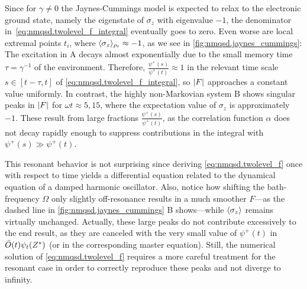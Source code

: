 Since for $\gamma \neq 0$ the Jaynes-Cummings model is expected to relax to the electronic ground state, namely the eigenstate of $\sigma_z$ with eigenvalue $-1$, the denominator in~\ref{eq:nmqsd.twolevel_f_integral} eventually goes to zero.
Even worse are local extremal points $t_i$, where $\langle \sigma_z \rangle_{\rho_t} \approx -1$, as we see in \autoref{fig:nmqsd.jaynes_cummings}:
The excitation in A decays almost exponentially due to the small memory time $\tau = \gamma^{-1}$ of the environment.
Therefore, $\frac{\psi^+(s)}{\psi^+(t)} \approx 1$ in the relevant time scale $s \in [t - \tau, t]$ of \autoref{eq:nmqsd.twolevel_f_integral}, so $\vert F \vert$ approaches a constant value uniformly.
In contrast, the highly non-Markovian system B shows singular peaks in $\vert F \vert$ for $\omega t \approx 5, 15$, where the expectation value of $\sigma_z$ is approximately $-1$.
These result from large fractions $\frac{\psi^+(s)}{\psi^+(t)}$, as the correlation function $\alpha$ does not decay rapidly enough to suppress contributions in the integral with $\psi^+(s) \gg \psi^+(t)$.


This resonant behavior is not surprising since deriving \autoref{eq:nmqsd.twolevel_f} once with respect to time yields a differential equation related to the dynamical equation of a damped harmonic oscillator.
Also, notice how shifting the bath-frequency $\Omega$ only slightly off-resonance results in a much smoother $F$---as the dashed line in \autoref{fig:nmqsd.jaynes_cummings} B shows---while $\langle \sigma_z \rangle$ remains virtually unchanged.
Actually, these large peaks do not contribute excessively to the end result, as they are canceled with the very small value of $\psi^+(t)$ in $\bar O(t) \psitZ$ (or in the corresponding master equation).
Still, the numerical solution of \autoref{eq:nmqsd.twolevel_f} requires a more careful treatment for the resonant case in order to correctly reproduce these peaks and not diverge to infinity.\\


